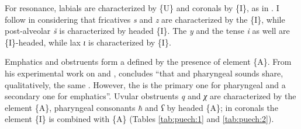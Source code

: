 \documentclass[output=paper]{langsci/langscibook}
\begin{document}
For resonance, labials are characterized by \{U\} and coronals by \{I\}, as in \citet{Bellem2007}. I follow \citet[75]{Backley2011} in considering that fricatives \textit{s} and \textit{z} are characterized by the   \{I\}, while post-alveolar \textit{š} is characterized by headed \{I\}. The  \textit{y} and the tense  \textit{i} as well are \{I\}-headed, while lax \textit{ɩ} is characterized by  \{I\}.

Emphatics and  obstruents form a  defined by the presence of element \{A\}. From his experimental work on  and , \citet[198]{Laufer1988} concludes “that  and pharyngeal sounds share, qualitatively, the same . However, the  is the primary one for pharyngeal and a secondary one for emphatics”. 
Uvular obstruents \textit{q} and \textit{χ} are characterized by the  element \{A\}, 
pharyngeal consonants \textit{ħ} and \textit{ʕ} by headed \{A\}; 
in  coronals the element \{I\} is combined with \{A\} (Tables \ref{tab:puech:1} and \ref{tab:puech:2}).

\end{document}
